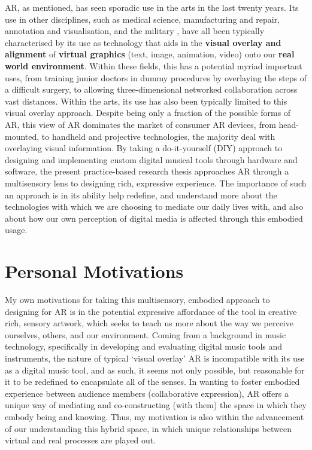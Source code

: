 AR, as mentioned, has seen sporadic use in the arts in the last twenty years. Its use in other disciplines, such as medical science, manufacturing and repair, annotation and visualisation, and the military \citep{azuma1997}, have all been typically characterised by its use as technology that aids in the \textbf{visual overlay and alignment} of \textbf{virtual graphics} (text, image, animation, video) onto our \textbf{real world environment}. Within these fields, this has a potential myriad important uses, from training junior doctors in dummy procedures by overlaying the steps of a difficult surgery, to allowing three-dimensional networked collaboration across vast distances. Within the arts, its use has also been typically limited to this visual overlay approach. Despite being only a fraction of the possible forms of AR, this view of AR dominates the market of consumer AR devices, from head-mounted, to handheld and projective technologies, the majority deal with overlaying visual information.  By taking a do-it-yourself (DIY) approach to designing and implementing custom digital musical tools through hardware and software, the present practice-based research thesis approaches AR through a multisensory lens to designing rich, expressive experience. The importance of such an approach is in its ability help redefine, and understand more about the technologies with which we are choosing to mediate our daily lives with, and also about how our own perception of digital media is affected through this embodied usage. 



\section{Personal Motivations}\label{sec: introduction-motivations}
My own motivations for taking this multisensory, embodied approach to designing for AR is in the potential expressive affordance of the tool in creative rich, sensory artwork, which seeks to teach us more about the way we perceive ourselves, others, and our environment. Coming from a background in music technology, specifically in developing and evaluating digital music tools and instruments, the nature of typical `visual overlay' AR is incompatible with its use as a digital music tool, and as such, it seems not only possible, but reasonable for it to be redefined to encapsulate all of the senses. In wanting to foster embodied experience between audience members (collaborative expression), AR offers a unique way of mediating and co-constructing (with them) the space in which they embody being and knowing. Thus, my motivation is also within the advancement of our understanding this hybrid space, in which unique relationships between virtual and real processes are played out.



